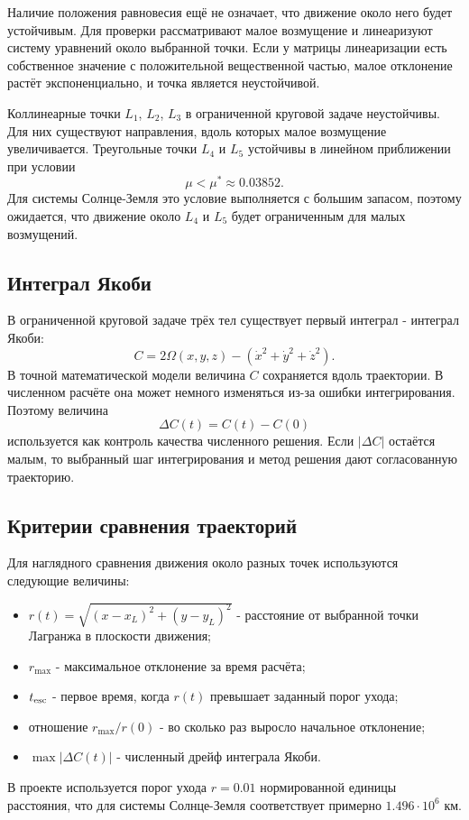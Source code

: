 Наличие положения равновесия ещё не означает, что движение около него будет
устойчивым. Для проверки рассматривают малое возмущение и линеаризуют систему
уравнений около выбранной точки. Если у матрицы линеаризации есть собственное
значение с положительной вещественной частью, малое отклонение растёт
экспоненциально, и точка является неустойчивой.

Коллинеарные точки $L_1$, $L_2$, $L_3$ в ограниченной круговой задаче
неустойчивы. Для них существуют направления, вдоль которых малое возмущение
увеличивается. Треугольные точки $L_4$ и $L_5$ устойчивы в линейном
приближении при условии
\[
  \mu < \mu^* \approx 0.03852.
\]
Для системы Солнце-Земля это условие выполняется с большим запасом, поэтому
ожидается, что движение около $L_4$ и $L_5$ будет ограниченным для малых
возмущений.

\subsection*{Интеграл Якоби}

В ограниченной круговой задаче трёх тел существует первый интеграл -
интеграл Якоби:
\[
  C = 2\Omega(x,y,z) - \left(\dot{x}^2+\dot{y}^2+\dot{z}^2\right).
\]
В точной математической модели величина $C$ сохраняется вдоль траектории.
В численном расчёте она может немного изменяться из-за ошибки интегрирования.
Поэтому величина
\[
  \Delta C(t)=C(t)-C(0)
\]
используется как контроль качества численного решения. Если $|\Delta C|$
остаётся малым, то выбранный шаг интегрирования и метод решения дают
согласованную траекторию.

\subsection*{Критерии сравнения траекторий}

Для наглядного сравнения движения около разных точек используются следующие
величины:
\begin{itemize}
  \item $r(t)=\sqrt{(x-x_L)^2+(y-y_L)^2}$ - расстояние от выбранной точки
  Лагранжа в плоскости движения;
  \item $r_{\max}$ - максимальное отклонение за время расчёта;
  \item $t_{\rm esc}$ - первое время, когда $r(t)$ превышает заданный порог
  ухода;
  \item отношение $r_{\max}/r(0)$ - во сколько раз выросло начальное
  отклонение;
  \item $\max|\Delta C(t)|$ - численный дрейф интеграла Якоби.
\end{itemize}
В проекте используется порог ухода $r=0.01$ нормированной единицы расстояния,
что для системы Солнце-Земля соответствует примерно $1.496\cdot 10^6$ км.
